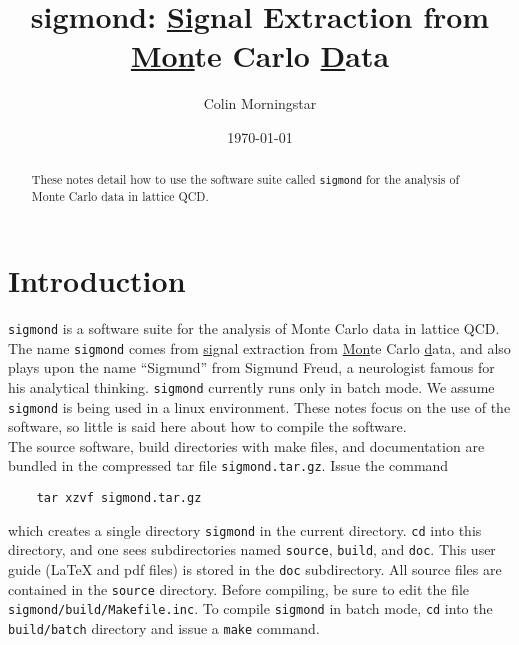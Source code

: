 \documentclass[12pt]{article}
\newcommand{\sigmond}{\texttt{sigmond} }
\newcommand{\vb}{\texttt}
\begin{document}
\title{\bf sigmond: \underline{Sig}nal Extraction from\\ 
\underline{Mon}te Carlo 
\underline{D}ata}
\author{Colin Morningstar}
\date{\today}
\maketitle
\begin{abstract}
These notes detail how to use the software suite called \sigmond for
the analysis of Monte Carlo data in lattice QCD.
\end{abstract}

\newpage

\tableofcontents

\newpage

\section{Introduction}

\sigmond is a software suite for the analysis of Monte Carlo data in 
lattice QCD.  The name \texttt{sigmond} comes from \underline{sig}nal 
extraction from \underline{Mon}te Carlo \underline{d}ata, and also plays 
upon the name ``Sigmund'' from Sigmund Freud, a neurologist famous for 
his analytical thinking.  
\sigmond currently runs only in batch mode.
We assume \sigmond is being used
in a linux environment.  These notes focus on the use of the software,
so little is said here about how to compile the software.\\

The source software, build directories with make files, and documentation
are bundled in the compressed tar file \vb{sigmond.tar.gz}.  Issue the
command
\begin{verbatim}
    tar xzvf sigmond.tar.gz
\end{verbatim}
which creates a single directory \vb{sigmond} in the current directory.
\vb{cd} into this directory, and one sees subdirectories named \vb{source}, 
\vb{build}, and \vb{doc}.  This user guide (LaTeX and pdf files)
is stored in the \vb{doc} subdirectory.  All source files are contained in 
the \vb{source} directory.   Before compiling, be sure to edit the file 
\vb{sigmond/build/Makefile.inc}.  To compile \vb{sigmond} in batch mode, 
\vb{cd} into the \vb{build/batch} directory and 
issue a \vb{make} command. \\ 
\end{document}
